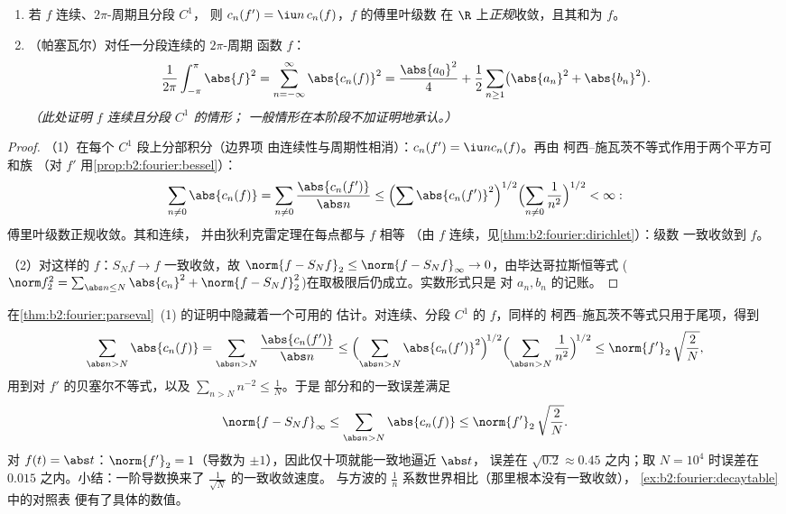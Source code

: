 \begin{theorem}\label{thm:b2:fourier:parseval}
\begin{enumerate}
  \item 若 $f$ 连续、$2\pi$-周期且分段 $C^1$，
        则 $c_n(f') = \iu n\,c_n(f)$，$f$ 的傅里叶级数
        在 $\R$ 上\emph{正规}收敛，且其和为 $f$。
  \item （帕塞瓦尔）对任一分段连续的 $2\pi$-周期
        函数 $f$：
        \[
        \frac{1}{2\pi}\int_{-\pi}^{\pi}\abs{f}^2
        = \sum_{n=-\infty}^{\infty} \abs{c_n(f)}^2
        = \frac{\abs{a_0}^2}{4} + \frac12\sum_{n\geq1}
        \bigl(\abs{a_n}^2 + \abs{b_n}^2\bigr).
        \]
        \emph{（此处证明 $f$ 连续且分段 $C^1$ 的情形；
        一般情形在本阶段不加证明地承认。）}
\end{enumerate}
\end{theorem}

\begin{proof}
（1）在每个 $C^1$ 段上分部积分（边界项
由连续性与周期性相消）：$c_n(f') = \iu n c_n(f)$。再由
柯西–施瓦茨不等式作用于两个平方可和族
（对 $f'$ 用\cref{prop:b2:fourier:bessel}）：
\[
\sum_{n \neq 0} \abs{c_n(f)} = \sum_{n\neq0}
\frac{\abs{c_n(f')}}{\abs n}
\leq \Bigl(\sum \abs{c_n(f')}^2\Bigr)^{1/2}
\Bigl(\sum_{n\neq0}\frac{1}{n^2}\Bigr)^{1/2} < \infty :
\]
傅里叶级数正规收敛。其和连续，
并由狄利克雷定理在每点都与 $f$ 相等
（由 $f$ 连续，见\cref{thm:b2:fourier:dirichlet}）：级数
一致收敛到 $f$。

（2）对这样的 $f$：$S_N f \to f$ 一致收敛，故 $\norm{f - S_Nf}_2
\leq \norm{f - S_Nf}_\infty \to 0$，由毕达哥拉斯恒等式
($\norm f_2^2 = \sum_{\abs n \leq N}\abs{c_n}^2 + \norm{f -
S_Nf}_2^2$)在取极限后仍成立。实数形式只是
对 $a_n, b_n$ 的记账。
\end{proof}

\begin{example}[$C^1$ 尾项估计的定量化]\label{ex:b2:fourier:tailbound}
在\cref{thm:b2:fourier:parseval}~(1) 的证明中隐藏着一个可用的
估计。对连续、分段 $C^1$ 的 $f$，同样的
柯西–施瓦茨不等式只用于尾项，得到
\[
\sum_{\abs n > N}\abs{c_n(f)}
= \sum_{\abs n > N}\frac{\abs{c_n(f')}}{\abs n}
\leq \Bigl(\sum_{\abs n > N}\abs{c_n(f')}^2\Bigr)^{\!1/2}
\Bigl(\sum_{\abs n>N}\frac{1}{n^2}\Bigr)^{\!1/2}
\leq \norm{f'}_2\,\sqrt{\frac{2}{N}} ,
\]
用到对 $f'$ 的贝塞尔不等式，以及 $\sum_{n>N}n^{-2} \leq \frac1N$。于是
部分和的一致误差满足
\[
\norm{f - S_Nf}_\infty
\leq \sum_{\abs n>N}\abs{c_n(f)}
\leq \norm{f'}_2\,\sqrt{\frac2N} .
\]
对 $f(t) = \abs t$：$\norm{f'}_2 = 1$（导数为
$\pm1$），因此仅十项就能一致地逼近 $\abs t$，
误差在 $\sqrt{0.2} \approx 0.45$ 之内；取 $N = 10^4$ 时误差在
$0.015$ 之内。小结：一阶导数换来了
$\frac{1}{\sqrt N}$ 的一致收敛速度。
与方波的 $\frac1n$ 系数世界相比（那里根本没有一致收敛），
\cref{ex:b2:fourier:decaytable} 中的对照表
便有了具体的数值。
\end{example}

